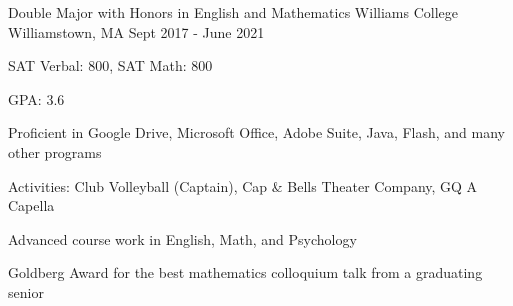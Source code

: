 \begin{cventries}
  \cventry
    {Double Major with Honors in English and Mathematics}
    {Williams College}
    {Williamstown, MA}
    {Sept 2017 - June 2021}
    {
    \begin{cvitems}
      \item{SAT Verbal: 800, SAT Math: 800}
      \item {GPA: 3.6}
      \item {Proficient in Google Drive, Microsoft Office, Adobe Suite, Java, Flash, and many other programs}
      \item {Activities: Club Volleyball (Captain), Cap \& Bells Theater Company, GQ A Capella}
      \item {Advanced course work in English, Math, and Psychology}
      \item {Goldberg Award for the best mathematics colloquium talk from a graduating senior}
    \end{cvitems}
    }
\end{cventries}
